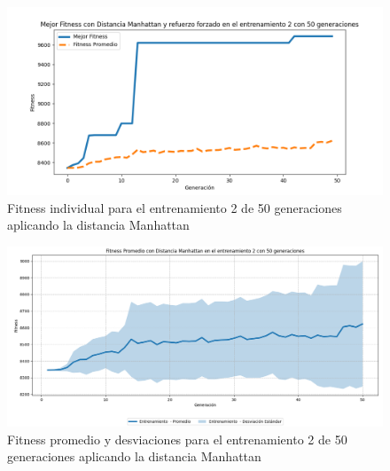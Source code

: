 \documentclass[conference]{IEEEtran}
\begin{document}
\begin{figure}[H]
    \centering
    \includegraphics[width=0.9 \linewidth]{Manhattan/Fitness_individual_50Gen/Fitness_2_Manh_50Gen.png}
    \caption{Fitness individual para el entrenamiento 2 de 50 generaciones aplicando la distancia Manhattan}
    \label{fig:manhattan_2_50}
\end{figure}
\begin{figure}
    \centering
    \includegraphics[width=0.9 \linewidth]{Manhattan/Fitness_individual_50Gen/Fitness_2_Manh_50Gen_Sombra.png}
    \caption{Fitness promedio y desviaciones para el entrenamiento 2 de 50 generaciones aplicando la distancia Manhattan}
    \label{fig:manhattan_2_50_sombra}
\end{figure}
\end{document}
